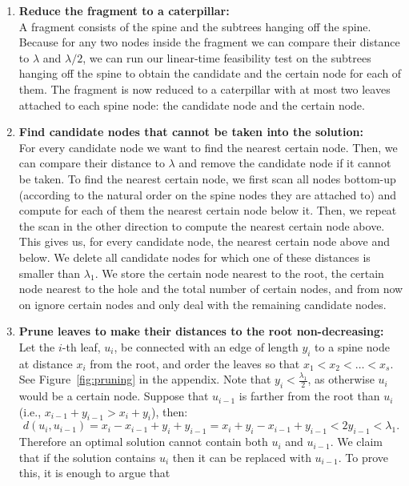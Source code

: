 \documentclass[a4paper,UKenglish]{lipics-v2016}
\theoremstyle{plain}
\begin{document}
\begin{enumerate}
\item\textbf{Reduce the fragment to a caterpillar:}\\
A fragment consists of the spine and the subtrees hanging off the spine. Because for any two nodes inside the fragment we can compare
their distance to $\lambda$ and $\lambda/2$, we can run our linear-time feasibility test on the subtrees hanging off the spine to obtain
the candidate and the certain node for each of them. The fragment is now reduced to a caterpillar with at most two leaves attached to each
spine node: the candidate node and the certain node.
\item\label{removing certain nodes}
\textbf{Find candidate nodes that cannot be taken into the solution:}\\
\label{removing impossible candidate nodes}
For every candidate node we want to find the nearest certain node. Then, we can compare their distance to $\lambda$ and remove the
candidate node if it cannot be taken. To find the nearest certain node, we first scan all nodes bottom-up (according to the natural order
on the spine nodes they are attached to) and compute for each of them the nearest certain node below it. Then, we repeat the scan
in the other direction to compute the nearest certain node above. This gives us, for every candidate node, the nearest certain node above
and below. We delete all candidate nodes for which one of these distances is smaller than $\lambda_{1}$.
We store the certain node nearest to the root, the certain node nearest to the hole and the total number of certain nodes,
and from now on ignore certain nodes and only deal with the remaining candidate nodes.
\item\label{making distances from the root monotone}
\textbf{Prune leaves to make their distances to the root non-decreasing:}\\
Let the $i$-th leaf, $u_{i}$, be connected with an edge of length $y_{i}$ to a spine node at distance $x_{i}$ from the root,
and order the leaves so that $x_{1}<x_{2}<\ldots<x_{s}$. See Figure~\ref{fig:pruning} in the appendix.
Note that $y_{i}<\frac{\lambda_{1}}{2}$, as otherwise $u_{i}$ would be a certain node.
Suppose that $u_{i-1}$ is farther from the root than $u_i$ (i.e.,
$x_{i-1}+y_{i-1} > x_i+y_i$), then:
$$d(u_{i},u_{i-1}) = x_i-x_{i-1}+y_i+y_{i-1} = x_{i} + y_{i} - x_{i-1} + y_{i-1} < 2y_{i-1} < \lambda_1.$$
Therefore an optimal solution cannot contain both $u_{i}$ and $u_{i-1}$. We claim that if the solution contains
$u_{i}$ then it can be replaced with $u_{i-1}$. To prove this, it is enough to argue that

\end{enumerate}
\end{document}
